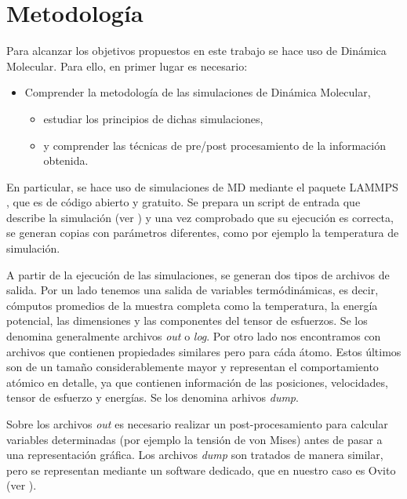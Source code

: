 
\section{Metodología}
\label{S1_5}

Para alcanzar los objetivos propuestos en este trabajo se hace uso de Dinámica Molecular. Para ello, en primer lugar es necesario:

\begin{itemize}
 \item Comprender la metodología de las simulaciones de Dinámica Molecular,
 \begin{itemize}
  \item estudiar los principios de dichas simulaciones,
  \item y comprender las técnicas de pre/post procesamiento de la información obtenida.
 \end{itemize}
\end{itemize}

En particular, se hace uso de simulaciones de MD mediante el paquete LAMMPS \citep{plimpton95}, que es de código abierto y gratuito. Se prepara un script de entrada que describe la simulación (ver ) y una vez comprobado que su ejecución es correcta, se generan copias con parámetros diferentes, como por ejemplo la temperatura de simulación.

A partir de la ejecución de las simulaciones, se generan dos tipos de archivos de salida. Por un lado tenemos una salida de variables termódinámicas, es decir, cómputos promedios de la muestra completa como la temperatura, la energía potencial, las dimensiones y las componentes del tensor de esfuerzos. Se los denomina generalmente archivos \textit{out} o \textit{log}. Por otro lado nos encontramos con archivos que contienen propiedades similares pero para cáda átomo. Estos últimos son de un tamaño considerablemente mayor y representan el comportamiento atómico en detalle, ya que contienen información de las posiciones, velocidades, tensor de esfuerzo y energías. Se los denomina arhivos \textit{dump}.

Sobre los archivos \textit{out} es necesario realizar un post-procesamiento para calcular variables determinadas (por ejemplo la tensión de von Mises) antes de pasar a una representación gráfica. Los archivos \textit{dump} son tratados de manera similar, pero se representan mediante un  software dedicado, que en nuestro caso es Ovito \citep{stukowski10} (ver ).

